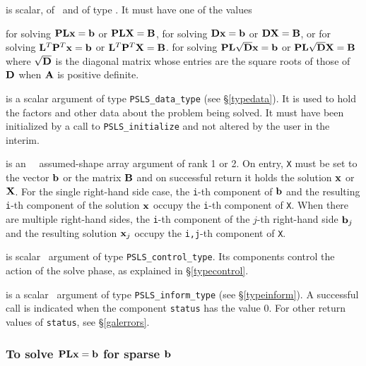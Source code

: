 \documentclass{galahad}
\newcommand{\packagename}{PSLS}
\begin{document}
\begin{description}
 is scalar, of \intentin\, and of type \character. It
must have one of the values
\begin{description}
 for solving ${\mathbf{P}} {\mathbf{L}} {\mathbf{x}} =  {\mathbf{b}}$ or
                     ${\mathbf{P}} {\mathbf{L}} {\mathbf{X}} =  {\mathbf{B}}$,
 for solving ${\mathbf{D}} {\mathbf{x}} =  {\mathbf{b}}$ or
                  ${\mathbf{D}} {\mathbf{X}} =  {\mathbf{B}}$, or
 for solving ${\mathbf{L}}^T {\mathbf{P}}^T {\mathbf{x}} =  {\mathbf{b}}$ or
                  ${\mathbf{L}}^T {\mathbf{P}}^T {\mathbf{X}} = {\mathbf{B}}$.
 for solving ${\mathbf{P}} {\mathbf{L}} \sqrt{{\mathbf{D}}} {\mathbf{x}} =  {\mathbf{b}}$ or
                  ${\mathbf{P}} {\mathbf{L}} \sqrt{{\mathbf{D}}} {\mathbf{X}} =  {\mathbf{B}}$
where $\sqrt{{\mathbf{D}}}$ is the diagonal matrix whose entries are the
square roots \hspace*{-4mm} of those of ${\mathbf{D}}$ when ${\mathbf{A}}$ is positive definite.

\end{description}

 is a scalar \intentinout argument of type
{\tt \packagename\_data\_type}
(see \S\ref{typedata}). It is used to hold the factors and other
data about the problem being solved.
It must have been initialized by a call to
{\tt \packagename\_ini\-tialize} and not altered by the user in the interim.

 is an \intentinout\ \realdp\ assumed-shape array argument of rank 1 or 2.
On entry, {\tt X} must be set
to the vector ${\mathbf{b}}$ or the matrix ${\mathbf{B}}$ and on successful return it holds
the solution ${\mathbf{x}}$ or ${\mathbf{X}}$. For the single right-hand side case, the
{\tt i}-th component of ${\mathbf{b}}$ and the resulting
{\tt i}-th component of the solution ${\mathbf{x}}$
occupy the {\tt i}-th component of {\tt X}. When there are multiple
right-hand sides, the
{\tt i}-th component of the $j$-th right-hand side ${\mathbf{b}}_j$
and the resulting solution ${\mathbf{x}}_j$ occupy the
{\tt i,j}-th component of {\tt X}.

 is scalar \intentin\ argument of type
{\tt \packagename\_control\_type}. Its components control the action
of the solve phase, as explained in
\S\ref{typecontrol}.

 is a scalar \intentinout\ argument of type
{\tt \packagename\_inform\_type}
(see \S\ref{typeinform}).
A successful call is indicated when the  component {\tt status} has the value 0.
For other return values of {\tt status}, see \S\ref{galerrors}.

\end{description}

\subsubsection{To solve ${\mathbf{P}} {\mathbf{L}} {\mathbf{x}} =  {\mathbf{b}}$ for sparse ${\mathbf{b}}$}
\label{sparse_solve}
\end{document}
